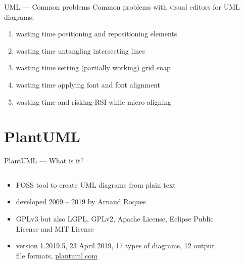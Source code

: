\documentclass{beamer}
\begin{document}
\begin{frame}{UML — Common problems}
Common problems with visual editors for UML diagrams:
\\\mbox{}
\begin{enumerate}
\item wasting time positioning and repositioning elements
\\\mbox{}
\item wasting time untangling intersecting lines
\\\mbox{}
\item wasting time setting (partially working) grid snap
\\\mbox{}
\item wasting time applying font and font alignment
\\\mbox{}
\item wasting time and risking RSI while micro-aligning
\end{enumerate}
\end{frame}



\section{PlantUML}

\begin{frame}{PlantUML — What is it?}
\begin{columns}
\begin{column}{.6\textwidth}
\begin{itemize}
\item \alert{FOSS tool to create UML diagrams from plain text}
\\\mbox{}
\item developed 2009 – 2019 by Arnaud Roques
\\\mbox{}
\item GPLv3 but also LGPL, GPLv2, Apache License, Eclipse Public License and MIT License
\\\mbox{}
\item version 1.2019.5, 23 April 2019, \alert{17 types of diagrams}, \alert{12 output file formats}, \href{http://plantuml.com}{plantuml.com}
\end{itemize}
\end{column}
\begin{column}{.4\textwidth}
\begin{figure}
\def\centering\svgwidth{\columnwidth}
\resizebox{\columnwidth}{!}{}
\end{figure}
\end{column}
\end{columns}
\end{frame}
\end{document}
